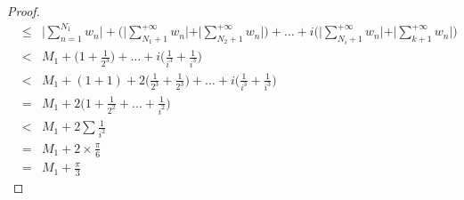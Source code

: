 \documentclass[a4paper,12pt,twoside]{ctexart}
\begin{document}
\begin{proof}
\begin{eqnarray*}
&\le&\vert\sum_{n=1}^{N_1}w_n\vert+ \bigg(\vert\sum_{N_1+1}^{+\infty}w_n\vert+\vert\sum_{N_2+1}^{+\infty}w_n \vert\bigg) +\dots+i\bigg(\vert\sum_{N_i+1}^{+\infty}w_n\vert +\vert\sum_{k+1}^{+\infty}w_n\vert\bigg)\\
&<& M_1+\bigg(1+\frac1{2^3}\bigg) +\dots+i\bigg(\frac1{i^3}+\frac1{i^3}\bigg)\\
&<& M_1+(1+1)+2\bigg(\frac1{2^3}+\frac1{2^3}\bigg) +\dots+i\bigg(\frac1{i^3}+\frac1{i^3}\bigg)\\
&=& M_1+2\bigg(1+\frac1{2^2}+\dots+\frac1{i^2}\bigg)\\
&<& M_1+2\sum\frac1{i^2}\\
&=& M_1+2\times\frac\pi6\\
&=& M_1+\frac\pi3
\end{eqnarray*}
\end{proof}
\end{document}
